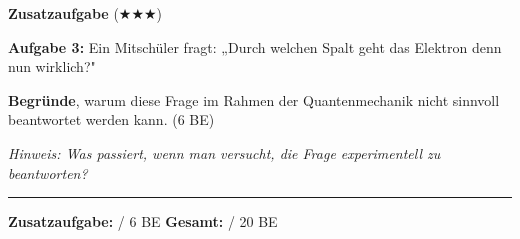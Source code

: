 \documentclass[11pt,a4paper]{article}
\begin{document}
{\large\textbf{Zusatzaufgabe} ($\bigstar\bigstar\bigstar$)}

\vspace{0.3em}

\textbf{Aufgabe 3:} Ein Mitschüler fragt: „Durch welchen Spalt geht das Elektron denn nun wirklich?"

\textbf{Begründe}, warum diese Frage im Rahmen der Quantenmechanik nicht sinnvoll beantwortet werden kann. \hfill (6 BE)

\textit{Hinweis: Was passiert, wenn man versucht, die Frage experimentell zu beantworten?}

\vspace{4cm}

\begin{center}
\rule{10cm}{0.5pt}

\textbf{Zusatzaufgabe:} \underline{\hspace{1.5cm}} / 6 BE \hspace{2cm} \textbf{Gesamt:} \underline{\hspace{1.5cm}} / 20 BE
\end{center}
\end{document}
